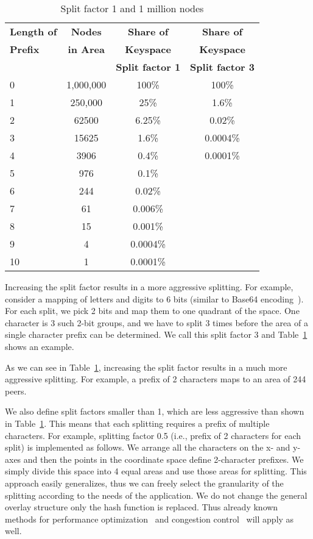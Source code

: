 \documentclass[fleqn,12pt,twoside]{article}
\begin{document}
\begin{table}[!tb]
  \centering
  \begin{tabular}{|l|c|c|c|}
    \hline
    \textbf{Length of}	& \textbf{Nodes} 	 & \textbf{Share of}	& \textbf{Share of}	\\	
    \textbf{Prefix}	& \textbf{in Area} 	 & \textbf{Keyspace}    & \textbf{Keyspace}\\
    		   	&		      	 & \textbf{Split factor 1} &\textbf{Split factor 3}\\
    \hline
    0 & 1,000,000 & 100\%	&100\%\\
    1 & 250,000	  & 25\%	&1.6\%\\
    2 & 62500	  & 6.25\%	&0.02\%\\
    3 & 15625 	  & 1.6\%	&0.0004\%\\
    4 & 3906	  & 0.4\%       &0.0001\%\\ 
    5 &	976	  & 0.1\%	&\\
    6 &	244	  & 0.02\%&\\
    7 &	61	  & 0.006\%&\\
    8 &	15        & 0.001\%&\\
    9 &	4	  & 0.0004\%&\\
    10&	1	  & 0.0001\%&\\
    \hline
  \end{tabular}
  \caption{Split factor 1 and 1 million nodes}
  \label{tab:quad-tree-f1}
  \vskip -3mm
\end{table}

Increasing the split factor results in a more aggressive splitting.
For example, consider a mapping of letters and digits to 6 bits
(similar to Base64 encoding~\cite{RFC2045}). For each split, we pick 2
bits and map them to one quadrant of the space. One character is 3
such 2-bit groups, and we have to split 3 times before the area of a
single character prefix can be determined. We call this split 
factor 3 and Table~\ref{tab:quad-tree-f1} shows an example.




As we can see in Table~\ref{tab:quad-tree-f1}, increasing the split
factor results in a much more aggressive splitting. For example, a
prefix of 2 characters maps to an area of 244 peers.

We also define split factors smaller than 1, which are less
aggressive than shown in Table~\ref{tab:quad-tree-f1}. This means that
each splitting requires a prefix of multiple characters. For example,
splitting factor 0.5 (i.e., prefix of 2 characters for each split) is
implemented as follows. We arrange all the characters on the x- and
y-axes and then the points in the coordinate space define 2-character
prefixes. We simply divide this space into 4 equal areas and use those
areas for splitting. This approach easily generalizes, thus we can
freely select the granularity of the splitting according to the needs
of the application. We do not change the general overlay structure only the hash function is replaced. 
Thus already known methods for performance optimization~\cite{dabek2004ddl} and 
congestion control~\cite{klemm2006ccd} will apply as well.
\end{document}
